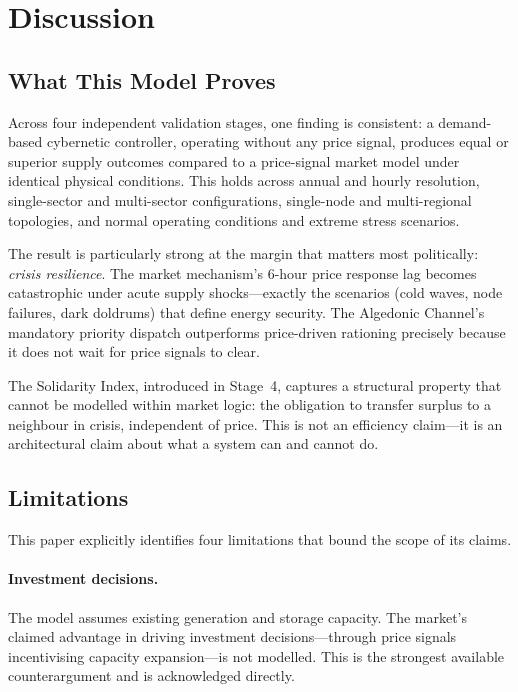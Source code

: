 \documentclass[12pt]{article}
\begin{document}
{{%
\section{Discussion}

\subsection{What This Model Proves}

Across four independent validation stages, one finding is consistent: a demand-based
cybernetic controller, operating without any price signal, produces equal or superior
supply outcomes compared to a price-signal market model under identical physical
conditions.
This holds across annual and hourly resolution, single-sector and multi-sector
configurations, single-node and multi-regional topologies, and normal operating
conditions and extreme stress scenarios.

The result is particularly strong at the margin that matters most politically:
\emph{crisis resilience}.
The market mechanism's 6-hour price response lag becomes catastrophic under acute
supply shocks---exactly the scenarios (cold waves, node failures, dark doldrums) that
define energy security.
The Algedonic Channel's mandatory priority dispatch outperforms price-driven rationing
precisely because it does not wait for price signals to clear.

The Solidarity Index, introduced in Stage~4, captures a structural property that
cannot be modelled within market logic: the obligation to transfer surplus to a
neighbour in crisis, independent of price.
This is not an efficiency claim---it is an architectural claim about what a system
can and cannot do.

\subsection{Limitations}
\label{sec:limits}

This paper explicitly identifies four limitations that bound the scope of its claims.

\paragraph{Investment decisions.}
The model assumes existing generation and storage capacity.
The market's claimed advantage in driving investment decisions---through price signals
incentivising capacity expansion---is not modelled.
This is the strongest available counterargument and is acknowledged directly.

}}
\end{document}
